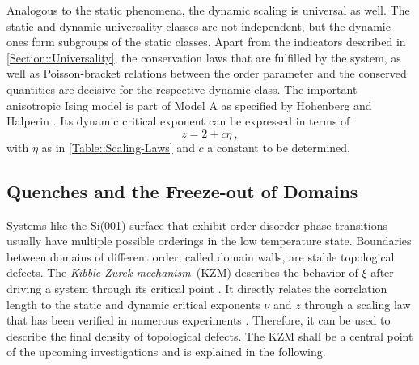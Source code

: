 	Analogous to the static phenomena, the dynamic scaling is universal as well. The static and dynamic universality classes are not independent, but the dynamic ones form subgroups of the static classes. Apart from the indicators described in \autoref{Section::Universality}, the conservation laws that are fulfilled by the system, as well as Poisson-bracket relations between the order parameter and the conserved quantities are decisive for the respective dynamic class. The important anisotropic Ising model is part of Model A as specified by Hohenberg and Halperin \cite{hohenberg1977theory}. Its dynamic critical exponent can be expressed in terms of
	\begin{equation} \label{Eq::Model-A-z}
		z =	2 + c \eta ~,
	\end{equation}
	with $\eta$ as in \autoref{Table::Scaling-Laws} and $c$ a constant to be determined.
	\subsection{Quenches and the Freeze-out of Domains} \label{Section::Quenches}
	Systems like the Si(001) surface that exhibit order-disorder phase transitions usually have multiple possible orderings in the low temperature state. Boundaries between domains of different order, called domain walls, are stable topological defects. The \textit{Kibble-Zurek mechanism}~(KZM) describes the behavior of $\xi$ after driving a system through its critical point \cite{kibble1976topology, zurek1985cosmological, zurek1996cosmological}. It directly relates the correlation length to the static and dynamic critical exponents $\nu$ and $z$ through a scaling law that has been verified in numerous experiments \cite{ruutu1996vortex, ulm2013observation, pyka2013topological}. Therefore, it can be used to describe the final density of topological defects. The KZM shall be a central point of the upcoming investigations and is explained in the following. \\
	
